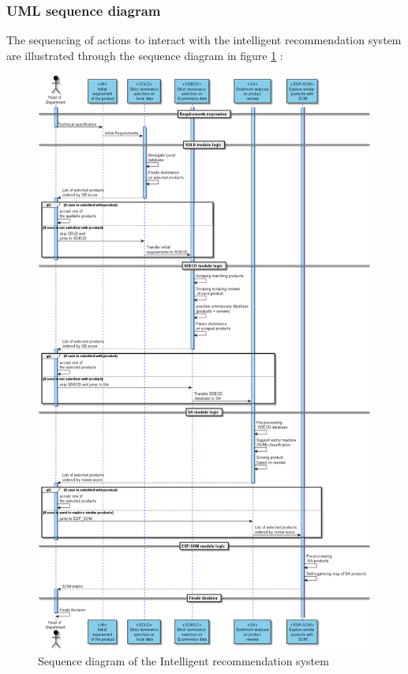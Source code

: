 \documentclass[preprint,3p,onecolumn]{elsarticle}
\begin{document}
\subsubsection{UML sequence diagram}
The sequencing of actions to interact with the intelligent recommendation system are illustrated through the sequence diagram in figure \ref{sequencediagram} :
\begin{figure}[H]
\centering
\includegraphics[scale=.30]{sequencediagram}
\caption{Sequence diagram of the Intelligent recommendation system}
\label{sequencediagram}
\end{figure}
\end{document}
